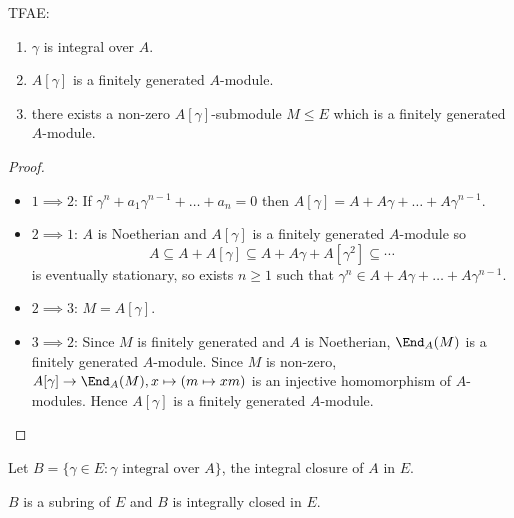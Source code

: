 \documentclass[a4paper]{article}
\begin{document}
\begin{lemma}
  TFAE:
  \begin{enumerate}
  \item \(\gamma\) is integral over \(A\).
  \item \(A[\gamma]\) is a finitely generated \(A\)-module.
  \item there exists a non-zero \(A[\gamma]\)-submodule \(M \leq E\) which is a finitely generated \(A\)-module.
  \end{enumerate}
\end{lemma}

\begin{proof}\leavevmode
  \begin{itemize}
  \item \(1 \implies 2\): If \(\gamma^n + a_1 \gamma^{n - 1} + \dots + a_n = 0\) then \(A[\gamma] = A + A \gamma + \dots + A\gamma^{n - 1}\).
  \item \(2 \implies 1\): \(A\) is Noetherian and \(A[\gamma]\) is a finitely generated \(A\)-module so
    \[
      A \subseteq A + A[\gamma] \subseteq A + A\gamma + A[\gamma^2] \subseteq \cdots
    \]
    is eventually stationary, so exists \(n \geq 1\) such that \(\gamma^n \in A + A\gamma + \dots + A\gamma^{n - 1}\).
  \item \(2 \implies 3\): \(M = A[\gamma]\).
  \item \(3 \implies 2\): Since \(M\) is finitely generated and \(A\) is Noetherian, \(\End_A(M)\) is a finitely generated \(A\)-module. Since \(M\) is non-zero, \(A[\gamma] \to \End_A(M), x \mapsto (m \mapsto xm)\) is an injective homomorphism of \(A\)-modules. Hence \(A[\gamma]\) is a finitely generated \(A\)-module.
  \end{itemize}
\end{proof}

Let \(B = \{\gamma \in E: \gamma \text{ integral over } A\}\), the integral closure of \(A\) in \(E\).

\begin{lemma}
  \(B\) is a subring of \(E\) and \(B\) is integrally closed in \(E\).
\end{lemma}
\end{document}
